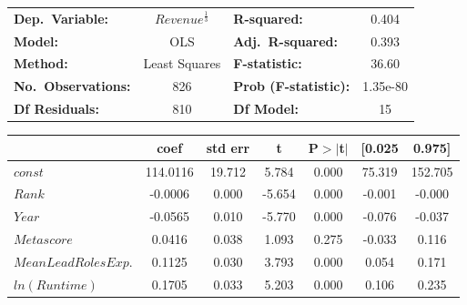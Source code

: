             \begin{table}[H]
            \begin{center}
                \begin{tabular}{lclc}
                    \toprule
                    \textbf{Dep.~Variable:}    & $Revenue^{\frac{1}{3}}$ & \textbf{  R-squared:         } & 0.404    \\
                    \textbf{Model:}            & OLS                     & \textbf{  Adj.~R-squared:    } & 0.393    \\
                    \textbf{Method:}           & Least Squares           & \textbf{  F-statistic:       } & 36.60    \\
                    \textbf{No.~Observations:} & 826                     & \textbf{  Prob (F-statistic):} & 1.35e-80 \\
                    \textbf{Df Residuals:}     & 810                     & \textbf{Df Model:}             & 15       \\
                    \bottomrule
                \end{tabular}
                \begin{tabular}{lcccccc}
                                                    & \textbf{coef} & \textbf{std err} & \textbf{t} & \textbf{P$> |$t$|$} & \textbf{[0.025} & \textbf{0.975]} \\
                    \midrule
                    \textbf{$const$}                & 114.0116      & 19.712           & 5.784      & 0.000               & 75.319          & 152.705         \\
                    \textbf{$Rank$}                 & -0.0006       & 0.000            & -5.654     & 0.000               & -0.001          & -0.000          \\
                    \textbf{$Year$}                 & -0.0565       & 0.010            & -5.770     & 0.000               & -0.076          & -0.037          \\
                    \textbf{$Metascore$}            & 0.0416        & 0.038            & 1.093      & 0.275               & -0.033          & 0.116           \\
                    \textbf{$Mean Lead Roles Exp.$} & 0.1125        & 0.030            & 3.793      & 0.000               & 0.054           & 0.171           \\
                    \textbf{$ln(Runtime)$}          & 0.1705        & 0.033            & 5.203      & 0.000               & 0.106           & 0.235           \\

\end{tabular}
\end{center}
\end{table}
